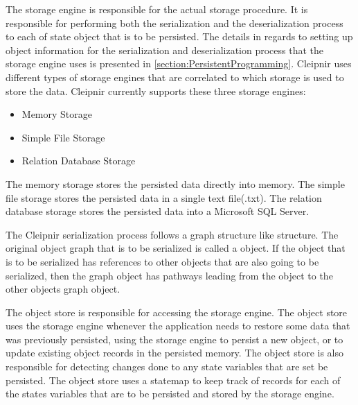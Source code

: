 The storage engine is responsible for the actual storage procedure. It is responsible for performing both the serialization and the deserialization process to each of state object that is to be persisted. The details in regards to setting up object information for the serialization and deserialization process that the storage engine uses is presented in \autoref{section:PersistentProgramming}. Cleipnir uses different types of storage engines that are correlated to which storage is used to store the data. Cleipnir currently supports these three storage engines:
\begin{itemize}
	\item{Memory Storage}
	\item{Simple File Storage}
	\item{Relation Database Storage}
\end{itemize}
\cites[p.~10,12]{PAPER:PaxosCleipnir}
The memory storage stores the persisted data directly into memory.
The simple file storage stores the persisted data in a single text file(.txt).
The relation database storage stores the persisted data into a Microsoft SQL Server\cite{WEB:MSSQL}.

The Cleipnir serialization process follows a graph structure like structure. The original object graph that is to be serialized is called a  object. If the object that is to be serialized has references to other objects that are also going to be serialized, then the graph object has pathways leading from the  object to the other objects graph object\cite[p.~10]{PAPER:PaxosCleipnir}.

The object store is responsible for accessing the storage engine. The object store uses the storage engine whenever the application needs to restore some data that was previously persisted, using the storage engine to persist a new object, or to update existing object records in the persisted memory. The object store is also responsible for detecting changes done to any state variables that are set be persisted. 
The object store uses a statemap to keep track of records for each of the states variables that are to be persisted and stored by the storage engine\cite[p.~11]{PAPER:PaxosCleipnir}. 

